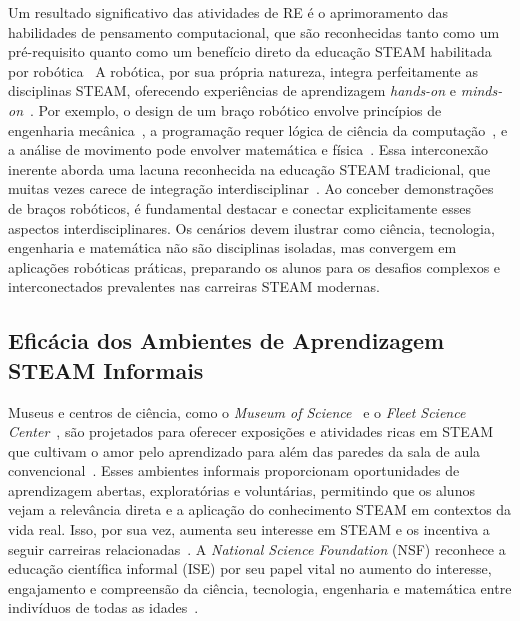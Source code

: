 \documentclass[%
  a4paper,%
  12pt,%
  fleqn,%
  english,%
  brazilian,%
]{article}
\begin{document}
Um resultado significativo das atividades de RE é o aprimoramento das habilidades de pensamento computacional, que são reconhecidas tanto como um pré-requisito quanto como um benefício direto da educação STEAM habilitada por robótica~\cite{rahman2024DigitalK12HRI} A robótica, por sua própria natureza, integra perfeitamente as disciplinas STEAM, oferecendo experiências de aprendizagem \emph{hands-on} e \emph{minds-on}~\cite{cheung2024SummerLibraries}. Por exemplo, o design de um braço robótico envolve princípios de engenharia mecânica~\cite{acebottImportanceRobotics2025}, a programação requer lógica de ciência da computação~\cite{whalesbotRevolutionizingSTEM2025}, e a análise de movimento pode envolver matemática e física~\cite{acebottImportanceRobotics2025}. Essa interconexão inerente aborda uma lacuna reconhecida na educação STEAM tradicional, que muitas vezes carece de integração interdisciplinar~\cite{lim2024IntegratedSTEMRobotics}. Ao conceber demonstrações de braços robóticos, é fundamental destacar e conectar explicitamente esses aspectos interdisciplinares. Os cenários devem ilustrar como ciência, tecnologia, engenharia e matemática não são disciplinas isoladas, mas convergem em aplicações robóticas práticas, preparando os alunos para os desafios complexos e interconectados prevalentes nas carreiras STEAM modernas.

\subsection{Eficácia dos Ambientes de Aprendizagem STEAM Informais}
Museus e centros de ciência, como o \textit{Museum of Science}~\cite{mosTeachingSTEM2025} e o \textit{Fleet Science Center}~\cite{fleetScienceCenter2025}, são projetados para oferecer exposições e atividades ricas em STEAM que cultivam o amor pelo aprendizado para além das paredes da sala de aula convencional~\cite{mosTeachingSTEM2025}. Esses ambientes informais proporcionam oportunidades de aprendizagem abertas, exploratórias e voluntárias, permitindo que os alunos vejam a relevância direta e a aplicação do conhecimento STEAM em contextos da vida real. Isso, por sua vez, aumenta seu interesse em STEAM e os incentiva a seguir carreiras relacionadas~\cite{ross2024BeyondExhibits}. A \textit{National Science Foundation} (NSF) reconhece a educação científica informal (ISE) por seu papel vital no aumento do interesse, engajamento e compreensão da ciência, tecnologia, engenharia e matemática entre indivíduos de todas as idades~\cite{informalscienceFramework2008}.
\end{document}
